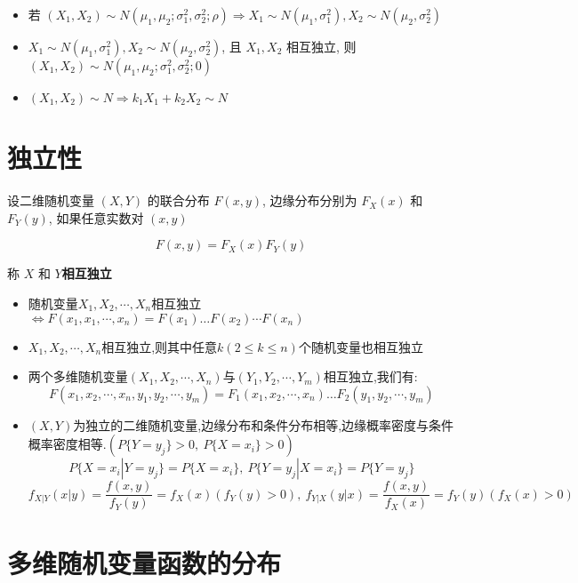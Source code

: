 \begin{corollary}[二维正态分布性质]
	\begin{itemize}
		\item 若 $(X_{1},X_{2}) \sim N(\mu_{1},\mu_{2};\sigma_{1}^{2},\sigma_{2}^{2};\rho)\Rightarrow X_{1}\sim N(\mu_{1},\sigma_{1}^{2}), X_{2}\sim N(\mu_{2},\sigma_{2}^{2})$  
		\item $X_{1}\sim N(\mu_{1},\sigma_{1}^{2}), X_{2}\sim N(\mu_{2},\sigma_{2}^{2})$, 且 $X_{1}, X_{2}$ 相互独立, 则 $(X_{1},X_{2})\sim N(\mu_{1},\mu_{2};\sigma_{1}^{2},\sigma_{2}^{2};0)$
		\item $(X_{1},X_{2})\sim N\Rightarrow k_{1}X_{1} + k_{2}X_{2}\sim N$
	\end{itemize}
\end{corollary}

\section{独立性}
\begin{definition}[独立性]
	设二维随机变量 $(X,Y)$ 的联合分布 $F(x,y)$, 边缘分布分别为 $F_{X}(x)$ 和 $F_{Y}(y)$, 如果任意实数对 $(x,y)$ 
	
	$$F(x,y) = F_{X}(x)F_{Y}(y)$$
	
	称 $X$ 和 $Y$\textbf{相互独立}
	
	\begin{itemize}
		\item 随机变量$X_{1},X_{2},\cdots,X_{n}$相互独立$\Leftrightarrow F(x_{1},x_{1},\cdots,x_{n})=F(x_{1})\dots F(x_{2})\cdots F(x_{n})$
		\item $X_{1},X_{2},\cdots,X_{n}$相互独立,则其中任意$k(2\leq k\leq n)$个随机变量也相互独立
		\item 两个多维随机变量$(X_{1},X_{2},\cdots,X_{n})$与$(Y_{1},Y_{2},\cdots,Y_{m})$相互独立,我们有: 
		$$F(x_{1},x_{2},\cdots,x_{n},y_{1},y_{2},\cdots,y_{m})=F_{1}(x_{1},x_{2},\cdots,x_{n})\dots F_{2}(y_{1},y_{2},\cdots,y_{m})$$
		\item $(X,Y)$为独立的二维随机变量,边缘分布和条件分布相等,边缘概率密度与条件概率密度相等.$(P\{Y=y_{j}\}>0,\ P\{X=x_{i}\}>0)$
		$$P\{X=x_{i}|Y=y_{j}\}=P\{X=x_{i}\},\ P\{Y=y_{j}|X=x_{i}\}=P\{Y=y_{j}\}$$
		$$f_{X|Y}(x|y)=\dfrac{f(x,y)}{f_{Y}(y)}=f_{X}(x)(f_{Y}(y)>0),\ f_{Y|X}(y|x)=\dfrac{f(x,y)}{f_{X}(x)}=f_{Y}(y)(f_{X}(x)>0)$$
	\end{itemize}
\end{definition}

\section{多维随机变量函数的分布}

